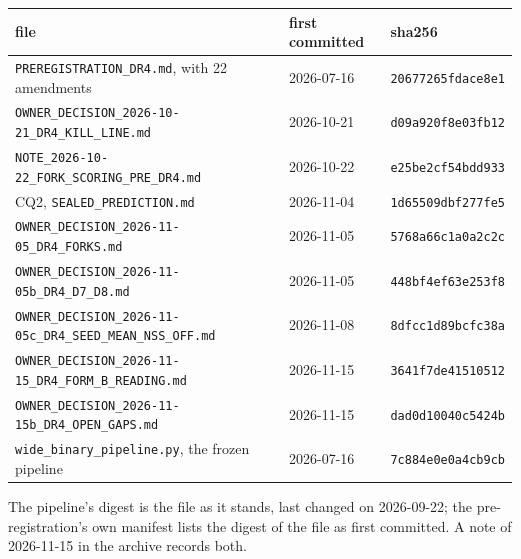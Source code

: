 \documentclass[10pt]{article}
\begin{document}
\begin{center}\small\begin{tabular}{lll}
\toprule
file & first committed & sha256\\
\midrule
\texttt{PREREGISTRATION\_DR4.md}, with 22 amendments & 2026-07-16 & \texttt{20677265fdace8e1}\\
\texttt{OWNER\_DECISION\_2026-10-21\_DR4\_KILL\_LINE.md} & 2026-10-21 & \texttt{d09a920f8e03fb12}\\
\texttt{NOTE\_2026-10-22\_FORK\_SCORING\_PRE\_DR4.md} & 2026-10-22 & \texttt{e25be2cf54bdd933}\\
CQ2, \texttt{SEALED\_PREDICTION.md} & 2026-11-04 & \texttt{1d65509dbf277fe5}\\
\texttt{OWNER\_DECISION\_2026-11-05\_DR4\_FORKS.md} & 2026-11-05 & \texttt{5768a66c1a0a2c2c}\\
\texttt{OWNER\_DECISION\_2026-11-05b\_DR4\_D7\_D8.md} & 2026-11-05 & \texttt{448bf4ef63e253f8}\\
\texttt{OWNER\_DECISION\_2026-11-05c\_DR4\_SEED\_MEAN\_NSS\_OFF.md} & 2026-11-08 & \texttt{8dfcc1d89bcfc38a}\\
\texttt{OWNER\_DECISION\_2026-11-15\_DR4\_FORM\_B\_READING.md} & 2026-11-15 & \texttt{3641f7de41510512}\\
\texttt{OWNER\_DECISION\_2026-11-15b\_DR4\_OPEN\_GAPS.md} & 2026-11-15 & \texttt{dad0d10040c5424b}\\
\texttt{wide\_binary\_pipeline.py}, the frozen pipeline & 2026-07-16 & \texttt{7c884e0e0a4cb9cb}\\
\bottomrule
\end{tabular}\end{center}

The pipeline's digest is the file as it stands, last changed on 2026-09-22; the pre-registration's own manifest lists the digest of the file as first committed. A note of 2026-11-15 in the archive records both.
\end{document}
